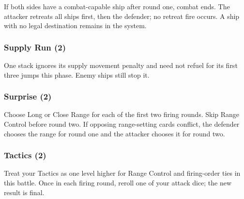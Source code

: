  If both sides have a
combat-capable ship after round one, combat ends. The attacker retreats all
ships first, then the defender; no retreat fire occurs. A ship with no legal
destination remains in the system.

\subsubsection{Supply Run (2)}

 One stack ignores its supply movement
penalty and need not refuel for its first three jumps this phase. Enemy ships
still stop it.

\subsubsection{Surprise (2)}

 Choose Long or Close
Range for each of the first two firing rounds. Skip Range Control before round
two. If opposing range-setting cards conflict, the defender chooses the range
for round one and the attacker chooses it for round two.

\subsubsection{Tactics (2)}

 Treat your Tactics
as one level higher for Range Control and firing-order ties in this battle.
Once in each firing round, reroll one of your attack dice; the new result is
final.
